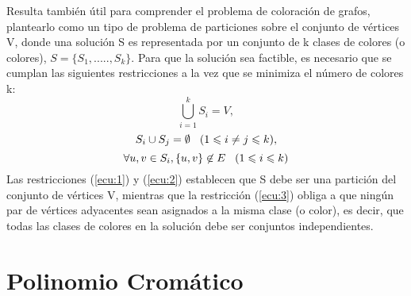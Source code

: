 \documentclass[12pt]{report}
\begin{document}
Resulta también útil para comprender el problema de coloración de grafos, plantearlo como un tipo de problema de particiones sobre el conjunto de vértices V, donde una solución S es representada por un conjunto de k clases de colores (o colores), $S = \{S_1,.....,S_k\}$. Para que la solución sea factible, es necesario que se cumplan las siguientes restricciones a la vez que se minimiza el número de colores k: 
\begin{equation}
\bigcup_{i=1}^{k}S_i = V, 
\label{ecu:1}
\end{equation}
\begin{equation}
S_i \cup S_j = \emptyset \hspace{0.3cm} (1 \leqslant \mathnormal{i} \not= \mathnormal{j} \leqslant k ),
\label{ecu:2}
\end{equation}
\begin{equation}
\forall \mathnormal{u,v} \in S_i , \{ \mathnormal{u,v} \} \not\in E \hspace{0.3cm}(1 \leqslant i \leqslant k)
\label{ecu:3}
\end{equation}
Las restricciones (\ref{ecu:1}) y (\ref{ecu:2}) establecen que S debe ser una partición del conjunto de vértices V, mientras que la restricción (\ref{ecu:3}) obliga a que ningún par de vértices adyacentes sean asignados a la misma clase (o color), es decir, que todas las clases de colores en la solución debe ser conjuntos independientes.

\section{Polinomio Cromático}
\end{document}
